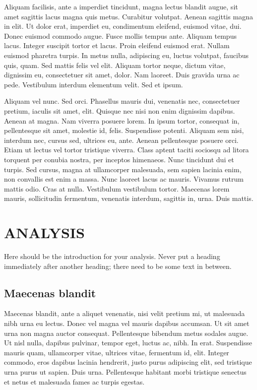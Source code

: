 \documentclass[12pt]{article}
\begin{document}
Aliquam facilisis, ante a imperdiet tincidunt, magna lectus blandit augue, sit amet sagittis lacus magna quis metus. Curabitur volutpat. Aenean sagittis magna in elit. Ut dolor erat, imperdiet eu, condimentum eleifend, euismod vitae, dui. Donec euismod commodo augue. Fusce mollis tempus ante. Aliquam tempus lacus. Integer suscipit tortor et lacus. Proin eleifend euismod erat. Nullam euismod pharetra turpis. In metus nulla, adipiscing eu, luctus volutpat, faucibus quis, quam. Sed mattis felis vel elit. Aliquam tortor neque, dictum vitae, dignissim eu, consectetuer sit amet, dolor. Nam laoreet. Duis gravida urna ac pede. Vestibulum interdum elementum velit. Sed et ipsum.

Aliquam vel nunc. Sed orci. Phasellus mauris dui, venenatis nec, consectetuer pretium, iaculis sit amet, elit. Quisque nec nisi non enim dignissim dapibus. Aenean at magna. Nam viverra posuere lorem. In ipsum tortor, consequat in, pellentesque sit amet, molestie id, felis. Suspendisse potenti. Aliquam sem nisi, interdum nec, cursus sed, ultrices eu, ante. Aenean pellentesque posuere orci. Etiam ut lectus vel tortor tristique viverra. Class aptent taciti sociosqu ad litora torquent per conubia nostra, per inceptos himenaeos. Nunc tincidunt dui et turpis. Sed cursus, magna at ullamcorper malesuada, sem sapien lacinia enim, non convallis est enim a massa. Nunc laoreet lacus ac mauris. Vivamus rutrum mattis odio. Cras at nulla. Vestibulum vestibulum tortor. Maecenas lorem mauris, sollicitudin fermentum, venenatis interdum, sagittis in, urna. Duis mattis. 

\section{ANALYSIS}

Here should be the introduction for your analysis. Never put a heading immediately after another heading; there need to be some text in between. 

\subsection{Maecenas blandit}

Maecenas blandit, ante a aliquet venenatis, nisi velit pretium mi, ut malesuada nibh urna eu lectus. Donec vel magna vel mauris dapibus accumsan. Ut sit amet urna non magna auctor consequat. Pellentesque bibendum metus sodales augue. Ut nisl nulla, dapibus pulvinar, tempor eget, luctus ac, nibh. In erat. Suspendisse mauris quam, ullamcorper vitae, ultrices vitae, fermentum id, elit. Integer commodo, eros dapibus lacinia hendrerit, justo purus adipiscing elit, sed tristique urna purus ut sapien. Duis urna. Pellentesque habitant morbi tristique senectus et netus et malesuada fames ac turpis egestas. \cite{test1}
\end{document}
